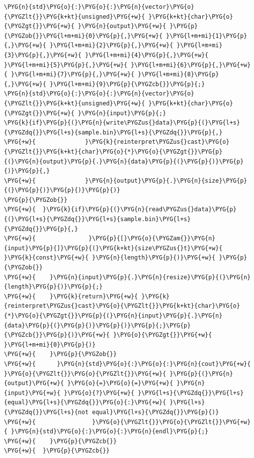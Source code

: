 
\begin{codeblockbg}
\begin{Verbatim}[commandchars=\\\{\},breaklines=true,breakanywhere=true,fontsize=\codefont,xleftmargin=17bp]
\PYG{n}{std}\PYG{o}{:}\PYG{o}{:}\PYG{n}{vector}\PYG{o}{\PYGZlt{}}\PYG{k+kt}{unsigned}\PYG{+w}{ }\PYG{k+kt}{char}\PYG{o}{\PYGZgt{}}\PYG{+w}{ }\PYG{n}{output}\PYG{+w}{ }\PYG{p}{\PYGZob{}}\PYG{l+m+mi}{0}\PYG{p}{,}\PYG{+w}{ }\PYG{l+m+mi}{1}\PYG{p}{,}\PYG{+w}{ }\PYG{l+m+mi}{2}\PYG{p}{,}\PYG{+w}{ }\PYG{l+m+mi}{3}\PYG{p}{,}\PYG{+w}{ }\PYG{l+m+mi}{4}\PYG{p}{,}\PYG{+w}{ }\PYG{l+m+mi}{5}\PYG{p}{,}\PYG{+w}{ }\PYG{l+m+mi}{6}\PYG{p}{,}\PYG{+w}{ }\PYG{l+m+mi}{7}\PYG{p}{,}\PYG{+w}{ }\PYG{l+m+mi}{8}\PYG{p}{,}\PYG{+w}{ }\PYG{l+m+mi}{9}\PYG{p}{\PYGZcb{}}\PYG{p}{;}
\PYG{n}{std}\PYG{o}{:}\PYG{o}{:}\PYG{n}{vector}\PYG{o}{\PYGZlt{}}\PYG{k+kt}{unsigned}\PYG{+w}{ }\PYG{k+kt}{char}\PYG{o}{\PYGZgt{}}\PYG{+w}{ }\PYG{n}{input}\PYG{p}{;}
\PYG{k}{if}\PYG{p}{(}\PYG{n}{write\PYGZus{}data}\PYG{p}{(}\PYG{l+s}{\PYGZdq{}}\PYG{l+s}{sample.bin}\PYG{l+s}{\PYGZdq{}}\PYG{p}{,}
\PYG{+w}{              }\PYG{k}{reinterpret\PYGZus{}cast}\PYG{o}{\PYGZlt{}}\PYG{k+kt}{char}\PYG{o}{*}\PYG{o}{\PYGZgt{}}\PYG{p}{(}\PYG{n}{output}\PYG{p}{.}\PYG{n}{data}\PYG{p}{(}\PYG{p}{)}\PYG{p}{)}\PYG{p}{,}
\PYG{+w}{              }\PYG{n}{output}\PYG{p}{.}\PYG{n}{size}\PYG{p}{(}\PYG{p}{)}\PYG{p}{)}\PYG{p}{)}
\PYG{p}{\PYGZob{}}
\PYG{+w}{  }\PYG{k}{if}\PYG{p}{(}\PYG{n}{read\PYGZus{}data}\PYG{p}{(}\PYG{l+s}{\PYGZdq{}}\PYG{l+s}{sample.bin}\PYG{l+s}{\PYGZdq{}}\PYG{p}{,}
\PYG{+w}{               }\PYG{p}{[}\PYG{o}{\PYGZam{}}\PYG{n}{input}\PYG{p}{]}\PYG{p}{(}\PYG{k+kt}{size\PYGZus{}t}\PYG{+w}{ }\PYG{k}{const}\PYG{+w}{ }\PYG{n}{length}\PYG{p}{)}\PYG{+w}{ }\PYG{p}{\PYGZob{}}
\PYG{+w}{    }\PYG{n}{input}\PYG{p}{.}\PYG{n}{resize}\PYG{p}{(}\PYG{n}{length}\PYG{p}{)}\PYG{p}{;}
\PYG{+w}{    }\PYG{k}{return}\PYG{+w}{ }\PYG{k}{reinterpret\PYGZus{}cast}\PYG{o}{\PYGZlt{}}\PYG{k+kt}{char}\PYG{o}{*}\PYG{o}{\PYGZgt{}}\PYG{p}{(}\PYG{n}{input}\PYG{p}{.}\PYG{n}{data}\PYG{p}{(}\PYG{p}{)}\PYG{p}{)}\PYG{p}{;}\PYG{p}{\PYGZcb{}}\PYG{p}{)}\PYG{+w}{ }\PYG{o}{\PYGZgt{}}\PYG{+w}{ }\PYG{l+m+mi}{0}\PYG{p}{)}
\PYG{+w}{    }\PYG{p}{\PYGZob{}}
\PYG{+w}{      }\PYG{n}{std}\PYG{o}{:}\PYG{o}{:}\PYG{n}{cout}\PYG{+w}{ }\PYG{o}{\PYGZlt{}}\PYG{o}{\PYGZlt{}}\PYG{+w}{ }\PYG{p}{(}\PYG{n}{output}\PYG{+w}{ }\PYG{o}{=}\PYG{o}{=}\PYG{+w}{ }\PYG{n}{input}\PYG{+w}{ }\PYG{o}{?}\PYG{+w}{ }\PYG{l+s}{\PYGZdq{}}\PYG{l+s}{equal}\PYG{l+s}{\PYGZdq{}}\PYG{o}{:}\PYG{+w}{ }\PYG{l+s}{\PYGZdq{}}\PYG{l+s}{not equal}\PYG{l+s}{\PYGZdq{}}\PYG{p}{)}
\PYG{+w}{                }\PYG{o}{\PYGZlt{}}\PYG{o}{\PYGZlt{}}\PYG{+w}{ }\PYG{n}{std}\PYG{o}{:}\PYG{o}{:}\PYG{n}{endl}\PYG{p}{;}
\PYG{+w}{    }\PYG{p}{\PYGZcb{}}
\PYG{+w}{  }\PYG{p}{\PYGZcb{}}
\end{Verbatim}
\end{codeblockbg}


